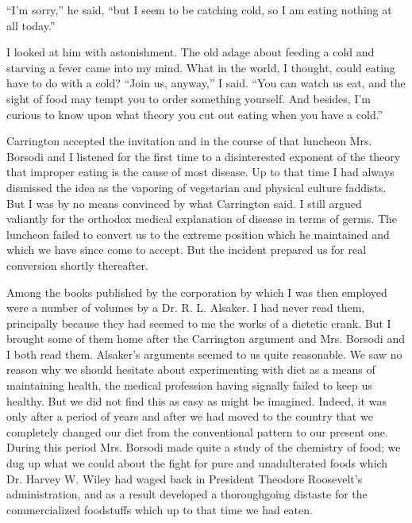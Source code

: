 \documentclass{book}
\begin{document}
“I’m sorry,” he said, “but I seem to be catching cold, so I am eating nothing at all today.”

I looked at him with astonishment. The old adage about feeding a cold and starving a fever came into my mind. What in the world, I thought, could eating have to do with a cold? “Join us, anyway,” I said. “You can watch us eat, and the sight of food may tempt you to order something yourself. And besides, I’m curious to know upon what theory you cut out eating when you have a cold.”

Carrington accepted the invitation and in the course of that luncheon Mrs. Borsodi and I listened for the first time to a disinterested exponent of the theory that improper eating is the cause of most disease. Up to that time I had always dismissed the idea as the vaporing of vegetarian and physical culture faddists. But I was by no means convinced by what Carrington said. I still argued valiantly for the orthodox medical explanation of disease in terms of germs. The luncheon failed to convert us to the extreme position which he maintained and which we have since come to accept. But the incident prepared us for real conversion shortly thereafter.

Among the books published by the corporation by which I was then employed were a number of volumes by a Dr. R. L. Alsaker. I had never read them, principally because they had seemed to me the works of a dietetic crank. But I brought some of them home after the Carrington argument and Mrs. Borsodi and I both read them. Alsaker’s arguments seemed to us quite reasonable. We saw no reason why we should hesitate about experimenting with diet as a means of maintaining health, the medical profession having signally failed to keep us healthy. But we did not find this as easy as might be imagined. Indeed, it was only after a period of years and after we had moved to the country that we completely changed our diet from the conventional pattern to our present one. During this period Mrs. Borsodi made quite a study of the chemistry of food; we dug up what we could about the fight for pure and unadulterated foods which Dr. Harvey W. Wiley had waged back in President Theodore Roosevelt’s administration, and as a result developed a thoroughgoing distaste for the commercialized foodstuffs which up to that time we had eaten.
\end{document}
